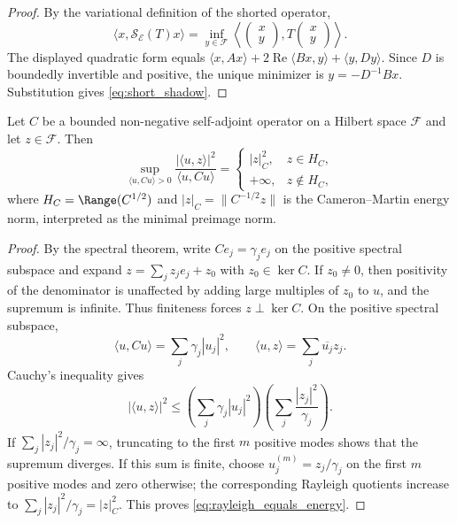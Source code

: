 \begin{proof}
By the variational definition of the shorted operator,
\[
  \langle x,\mathcal{S}_{\mathcal{E}}(T)x\rangle
  =
  \inf_{y\in\mathcal{F}}
  \left\langle
  \begin{pmatrix}x\\y\end{pmatrix},
  T
  \begin{pmatrix}x\\y\end{pmatrix}
  \right\rangle .
\]
The displayed quadratic form equals
$\langle x,Ax\rangle+2\operatorname{Re}\langle Bx,y\rangle+
\langle y,Dy\rangle$.  Since $D$ is boundedly invertible and positive, the unique
minimizer is $y=-D^{-1}Bx$.  Substitution gives \eqref{eq:short_shadow}.
\end{proof}

\begin{lemma}
\label{lem:rayleigh_covariance_energy}
Let $C$ be a bounded non-negative self-adjoint operator on a Hilbert space
$\mathcal{F}$ and let $z\in\mathcal{F}$.  Then
\begin{equation}
  \sup_{\langle u,Cu\rangle>0}
  \frac{|\langle u,z\rangle|^2}{\langle u,Cu\rangle}
  =
  \begin{cases}
    |z|_C^2, & z\in H_C,\\
    +\infty, & z\notin H_C,
  \end{cases}
  \label{eq:rayleigh_equals_energy}
\end{equation}
where $H_C=\Range(C^{1/2})$ and $|z|_C=\|C^{-1/2}z\|$ is the
Cameron--Martin energy norm, interpreted as the minimal preimage norm.
\end{lemma}

\begin{proof}
By the spectral theorem, write $C e_j=\gamma_j e_j$ on the positive spectral
subspace and expand $z=\sum_j z_j e_j+z_0$ with $z_0\in\ker C$.  If $z_0\ne0$,
then positivity of the denominator is unaffected by adding large multiples of
$z_0$ to $u$, and the supremum is infinite.  Thus finiteness forces
$z\perp\ker C$.  On the positive spectral subspace,
\[
  \langle u,Cu\rangle=\sum_j\gamma_j|u_j|^2,
  \qquad
  \langle u,z\rangle=\sum_j\overline{u_j}z_j.
\]
Cauchy's inequality gives
\[
  |\langle u,z\rangle|^2
  \le
  \left(\sum_j\gamma_j|u_j|^2\right)
  \left(\sum_j\frac{|z_j|^2}{\gamma_j}\right).
\]
If $\sum_j|z_j|^2/\gamma_j=\infty$, truncating to the first $m$ positive modes
shows that the supremum diverges.  If this sum is finite, choose
$u_j^{(m)}=z_j/\gamma_j$ on the first $m$ positive modes and zero otherwise;
the corresponding Rayleigh quotients increase to
$\sum_j|z_j|^2/\gamma_j=|z|_C^2$.  This proves
\eqref{eq:rayleigh_equals_energy}.
\end{proof}

